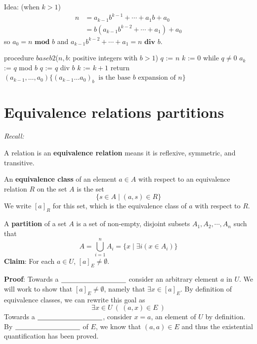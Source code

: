 \documentclass[12pt, oneside]{article}
\begin{document}
\begin{multicols}{2}
  \begin{minipage}{3.2in}
    Idea: {\tiny(when $k > 1$)} 
    \begin{align*}
      n &= a_{k-1} b^{k-1} + \cdots + a_1 b + a_0 \\
        &= b ( a_{k-1} b^{k-2} + \cdots + a_1) + a_0\end{align*}
    so $a_0 = n \textbf{ mod } b$ and $a_{k-1} b^{k-2} + \cdots + a_1 = n \textbf{ div } b$.

\end{minipage}
\columnbreak
\begin{algorithm}[caption={Calculating base $b$ expansion, from right}]
procedure $\textit{baseb2}$($n, b$: positive integers with $b > 1$)
$q$ := $n$
$k$ := $0$
while $q  \neq 0$
  $a_{k}$ := $q$ mod $b$
  $q$ := $q$ div $b$
  $k$ := $k+1$
return $(a_{k-1}, \ldots, a_0) \{(a_{k-1} \ldots a_0)_b~\textrm{ is the base } b \textrm{ expansion of } n \}$
\end{algorithm}
\end{multicols}

\vfill
\vfill \vfill
\section*{Equivalence relations partitions}


{\it Recall:} 


A relation is an {\bf equivalence relation} means it is reflexive, symmetric, and transitive. 

An {\bf equivalence class} of an element $a \in A$ 
with respect to an equivalence relation $R$ on the set $A$ is the set 
\[
    \{s \in A \mid (a, s) \in R \}
\] 
We write $[a]_R$ for this set, which is the equivalence class of $a$ with respect to $R$. 

A {\bf partition} of a set $A$ is a set of non-empty, disjoint subsets 
$A_1, A_2, \cdots, A_n$ such that 
\[
    A = \bigcup_{i=1}^{n} A_i = \{ x \mid \exists i (x \in A_i) \}
\] 
{\bf Claim}: For each  $a \in U$, $[a]_{E}  \neq  \emptyset$.

{\bf Proof}: Towards a $\underline{\phantom{\hspace{1.3in}}}$ 
consider an arbitrary element $a$ in $U$. 
We will work to show that $[a]_E \neq \emptyset$, namely that $\exists x \in [a]_E$.
By definition of equivalence classes, we can rewrite this goal as 
$$\exists x \in U ~( ~(a,x) \in E~)$$ 
Towards a $\underline{\phantom{\hspace{1.3in}}}$, consider $x = a$, 
an element of $U$ by definition. By $\underline{\phantom{\hspace{1.3in}}}$ of $E$, 
we know that $(a,a) \in E$  and thus the existential quantification has been proved.\\
\end{document}
